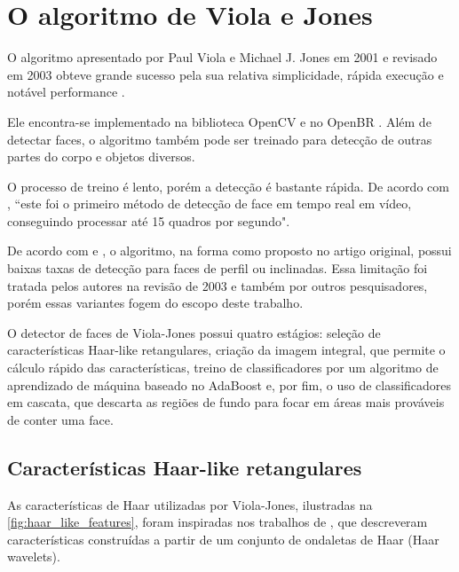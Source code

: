 \chapter{O algoritmo de Viola e Jones}\label{cap:viola_jones}


O algoritmo apresentado por Paul Viola e Michael J. Jones em 2001 \cite{Viola01rapidobject, viola2004robust} e revisado em 2003 \cite{jones2003fast} obteve grande sucesso pela sua relativa simplicidade, rápida execução e notável performance \cite{jensen2008implementing}.

Ele encontra-se implementado na biblioteca OpenCV \cite{bradski2000intel, opencvdocs} e no OpenBR \cite{klontz2013open}. Além de detectar faces, o algoritmo também pode ser treinado para detecção de outras partes do corpo \cite{mustafa2014obscenity} e objetos diversos.

O processo de treino é lento, porém a detecção é bastante rápida. De acordo com , ``este foi o primeiro método de detecção de face em tempo real em vídeo, conseguindo processar até 15 quadros por segundo".

De acordo com  e , o algoritmo, na forma como proposto no artigo original, possui baixas taxas de detecção para faces de perfil ou inclinadas. Essa limitação foi tratada pelos autores na revisão de 2003 \cite{jones2003fast} e também por outros pesquisadores, porém essas variantes fogem do escopo deste trabalho.

O detector de faces de Viola-Jones possui quatro estágios: seleção de características Haar-like retangulares, criação da imagem integral, que permite o cálculo rápido das características, treino de classificadores por um algoritmo de aprendizado de máquina baseado no AdaBoost e, por fim, o uso de classificadores em cascata, que descarta as regiões de fundo para focar em áreas mais prováveis de conter uma face.


\section{Características Haar-like retangulares}\label{sec:haar_features}

As características de Haar utilizadas por Viola-Jones, ilustradas na \autoref{fig:haar_like_features}, foram inspiradas nos trabalhos de , que descreveram características construídas a partir de um conjunto de ondaletas de Haar (Haar wavelets). 

